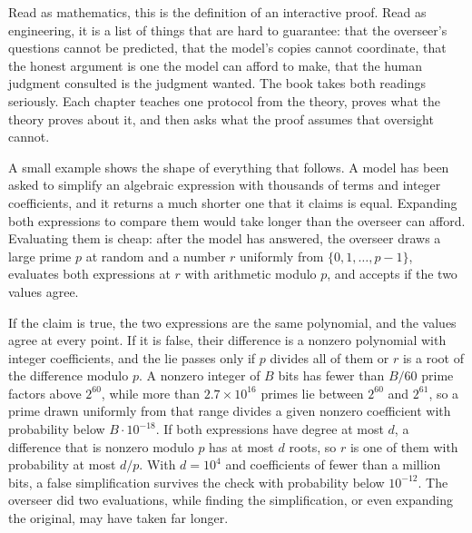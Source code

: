 \begin{refsection}
\noindent Read as mathematics, this is the definition of an interactive proof. Read as engineering, it is a list of things that are hard to guarantee: that the overseer's questions cannot be predicted, that the model's copies cannot coordinate, that the honest argument is one the model can afford to make, that the human judgment consulted is the judgment wanted. The book takes both readings seriously. Each chapter teaches one protocol from the theory, proves what the theory proves about it, and then asks what the proof assumes that oversight cannot.


A small example shows the shape of everything that follows. A model has been asked to simplify an algebraic expression with thousands of terms and integer coefficients, and it returns a much shorter one that it claims is equal. Expanding both expressions to compare them would take longer than the overseer can afford. Evaluating them is cheap: after the model has answered, the overseer draws a large prime $p$ at random and a number $r$ uniformly from $\{0,1,\dots,p-1\}$, evaluates both expressions at $r$ with arithmetic modulo $p$, and accepts if the two values agree.

If the claim is true, the two expressions are the same polynomial, and the values agree at every point. If it is false, their difference is a nonzero polynomial with integer coefficients, and the lie passes only if $p$ divides all of them or $r$ is a root of the difference modulo $p$. A nonzero integer of $B$ bits has fewer than $B/60$ prime factors above $2^{60}$, while more than $2.7\times10^{16}$ primes lie between $2^{60}$ and $2^{61}$, so a prime drawn uniformly from that range divides a given nonzero coefficient with probability below $B\cdot10^{-18}$. If both expressions have degree at most $d$, a difference that is nonzero modulo $p$ has at most $d$ roots, so $r$ is one of them with probability at most $d/p$. With $d=10^4$ and coefficients of fewer than a million bits, a false simplification survives the check with probability below $10^{-12}$. The overseer did two evaluations, while finding the simplification, or even expanding the original, may have taken far longer.


\end{refsection}

